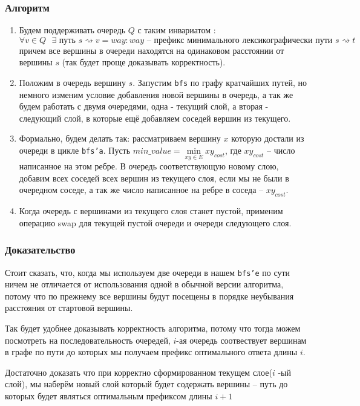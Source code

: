 \documentclass{article}
\begin{document}
\begin{itemize}
        \subsubsection*{Алгоритм}
        \begin{enumerate}
            \item Будем поддерживать очередь $Q$ с таким инвариатом : $$\forall v \in Q \mbox{ } \exists \mbox{ путь }s \rightsquigarrow v = way : way \mbox { -- префикс минимального лексикографически пути } s \rightsquigarrow t$$ причем все вершины в очереди находятся на одинаковом расстоянии от вершины $s$ (так будет проще доказывать корректность).
                \item Положим в очередь вершину $s$.  Запустим \texttt{bfs} по графу кратчайших путей, но немного изменим условие добавления новой вершины в очередь, а так же будем работать с двумя очередями, одна - текущий слой, а вторая - следующий слой, в которые ещё добавляем соседей вершин из текущего. 
                    \item Формально, будем делать так: рассматриваем вершину $x$ которую достали из очереди в цикле \texttt{bfs'a}. Пусть $min\_value = \min \limits_{xy \in E}xy_{cost}$, где $xy_{cost}$ -- число написанное на этом ребре. В очередь соответствующую новому слою, добавим всех соседей всех вершин из текущего слоя, если мы не были в очередном соседе, а так же число написанное на ребре в соседа -- $xy_{cost}$.
                    \item Когда очередь с вершинами из текущего слоя станет пустой, применим операцию swap для текущей пустой очереди и очереди следующего слоя.
        \end{enumerate}
        \subsubsection*{Доказательство}
        Стоит сказать, что, когда мы используем две очереди в нашем \texttt{bfs'e} по сути ничем не отличается от использования одной в обычной версии алгоритма, потому что по прежнему все вершины будут посещены в порядке неубывания расстояния от стартовой вершины. 
        
        Так будет удобнее доказывать корректность алгоритма, потому что тогда можем посмотреть на последовательность очередей, $i$-ая очередь соотвествует вершинам в графе по пути до которых мы получаем префикс оптимального ответа длины $i$. 
        
        Достаточно доказать что при корректно сформированном текущем слое($i$ -ый слой), мы наберём новый слой который будет содержать вершины -- путь до которых будет являться оптимальным префиксом длины $i + 1$
        

\end{itemize}
\end{document}
